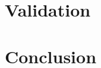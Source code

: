 \documentclass[a4paper]{report}
\theoremstyle{definition}
\begin{document}
	\chapter{Validation}
	
	\newpage
	\begin{comment}
	
	
  \end{comment}
	\newpage
	\chapter{Conclusion}
	\newpage
	\begin{comment}
	
	
	
	\end{comment}
	

  \newpage
	{}
	
\end{document}
